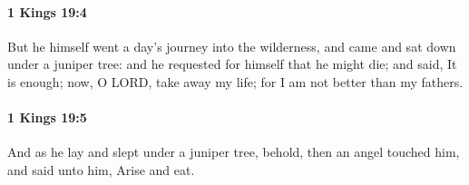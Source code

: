 		\paragraph{1 Kings 19:4} %
			\label{1KINGS-19-4}

			But he himself went a day’s journey into the wilderness, and came and sat down under a juniper tree: and he requested for himself that he might die; and said, It is enough; now, O LORD, take away my life; for I am not better than my fathers.


		\paragraph{1 Kings 19:5} %
			\label{1KINGS-19-5}

			And as he lay and slept under a juniper tree, behold, then an angel touched him, and said unto him, Arise and eat.


